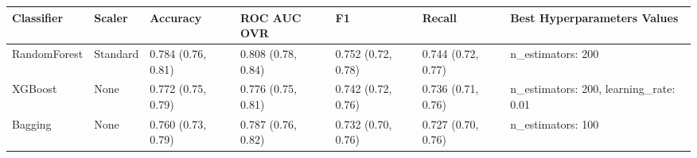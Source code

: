 \begin{tabular}{lllllll}
\toprule
Classifier & Scaler & Accuracy & ROC AUC OVR & F1 & Recall & Best Hyperparameters Values \\
\midrule
RandomForest & Standard & 0.784 (0.76, 0.81) & 0.808 (0.78, 0.84) & 0.752 (0.72, 0.78) & 0.744 (0.72, 0.77) & {{n\_estimators: 200}} \\
XGBoost & None & 0.772 (0.75, 0.79) & 0.776 (0.75, 0.81) & 0.742 (0.72, 0.76) & 0.736 (0.71, 0.76) & {{n\_estimators: 200, learning\_rate: 0.01}} \\
Bagging & None & 0.760 (0.73, 0.79) & 0.787 (0.76, 0.82) & 0.732 (0.70, 0.76) & 0.727 (0.70, 0.76) & {{n\_estimators: 100}} \\
\bottomrule
\end{tabular}
